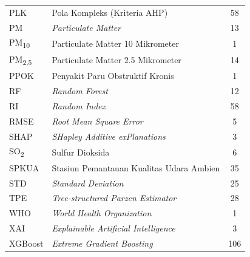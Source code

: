 \begin{longtable}{@{} l >{\raggedright\arraybackslash}p{7.5cm} c @{}}
PLK & Pola Kompleks (Kriteria AHP) & 58 \\
PM & \textit{Particulate Matter} & 13 \\
PM\textsubscript{10} & Particulate Matter 10 Mikrometer & 1 \\
PM\textsubscript{2,5} & Particulate Matter 2.5 Mikrometer & 14 \\
PPOK & Penyakit Paru Obstruktif Kronis & 1 \\
RF & \textit{Random Forest} & 12 \\
RI & \textit{Random Index} & 58 \\
RMSE & \textit{Root Mean Square Error} & 5 \\
SHAP & \textit{SHapley Additive exPlanations} & 3 \\
SO\textsubscript{2} & Sulfur Dioksida & 6 \\
SPKUA & Stasiun Pemantauan Kualitas Udara Ambien & 35 \\
STD & \textit{Standard Deviation} & 25 \\
TPE & \textit{Tree-structured Parzen Estimator} & 28 \\
WHO & \textit{World Health Organization} & 1 \\
XAI & \textit{Explainable Artificial Intelligence} & 3 \\
XGBoost & \textit{Extreme Gradient Boosting} & 106 \\

\end{longtable}